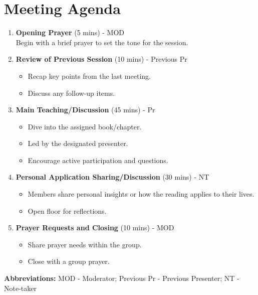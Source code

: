 \documentclass[10pt]{article}
\begin{document}
\section*{Meeting Agenda}
\begin{enumerate}
    \item \textbf{Opening Prayer} (5 mins) - MOD\\
    Begin with a brief prayer to set the tone for the session.
    
    \item \textbf{Review of Previous Session} (10 mins) - Previous Pr
    \begin{itemize}
        \item Recap key points from the last meeting.
        \item Discuss any follow-up items.
    \end{itemize}
    
    \item \textbf{Main Teaching/Discussion} (45 mins) - Pr
    \begin{itemize}
        \item Dive into the assigned book/chapter.
        \item Led by the designated presenter.
        \item Encourage active participation and questions.
    \end{itemize}
    
    \item \textbf{Personal Application Sharing/Discussion} (30 mins) - NT
    \begin{itemize}
        \item Members share personal insights or how the reading applies to their lives.
        \item Open floor for reflections.
    \end{itemize}
    
    \item \textbf{Prayer Requests and Closing} (10 mins) - MOD
    \begin{itemize}
        \item Share prayer needs within the group.
        \item Close with a group prayer.
    \end{itemize}
\end{enumerate}

\textbf{Abbreviations:} MOD - Moderator; Previous Pr - Previous Presenter; NT - Note-taker
\end{document}

